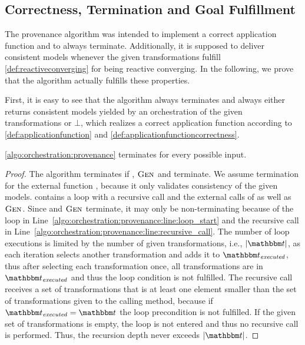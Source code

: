 \subsection{Correctness, Termination and Goal Fulfillment}

The provenance algorithm was intended to implement a correct application function and to always terminate.
Additionally, it is supposed to deliver consistent models whenever the given transformations fulfill \autoref{def:reactiveconverging} for being reactive converging.
In the following, we prove that the algorithm actually fulfills these properties.

First, it is easy to see that the algorithm always terminates and always either returns consistent models yielded by an orchestration of the given transformations or $\bot$, which realizes a correct application function according to \autoref{def:applicationfunction} and \autoref{def:applicationfunctioncorrectness}.

\begin{theorem}
    \autoref{algo:orchestration:provenance} terminates for every possible input.
\end{theorem}
\begin{proof}
    The algorithm terminates if , $\textsc{Gen}_{}$ and  terminate.
    We assume termination for the external function , because it only validates consistency of the given models.
     contains a loop with a recursive call and the external calls of  as well as $\textsc{Gen}_{}$.
    Since  and $\textsc{Gen}_{}$ terminate, it may only be non-terminating because of the loop in Line~\ref{algo:orchestration:provenance:line:loop_start} and the recursive call in Line~\ref{algo:orchestration:provenance:line:recursive_call}.
    The number of loop executions is limited by the number of given transformations, i.e., $\abs{\transformationset{T}}$, as each iteration selects another transformation and adds it to $\provalgexecuted$, thus after selecting each transformation once, all transformations are in $\provalgexecuted$ and thus the loop condition is not fulfilled.
    The recursive call receives a set of transformations that is at least one element smaller than the set of transformations given to the calling method, because if $\provalgexecuted = \transformationset{T}$ the loop precondition is not fulfilled. If the given set of transformations is empty, the loop is not entered and thus no recursive call is performed. Thus, the recursion depth never exceeds $\abs{\transformationset{T}}$.
\end{proof}

